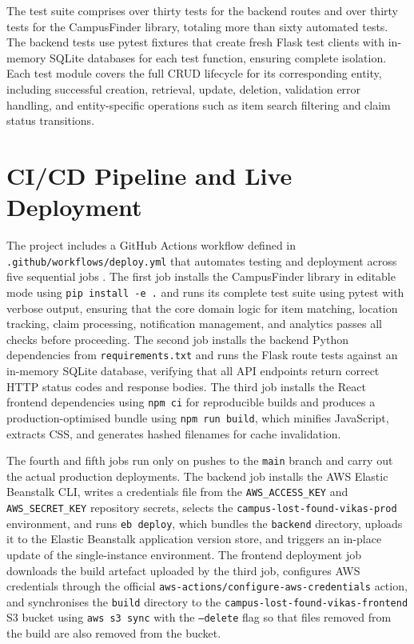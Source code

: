 \documentclass[conference]{IEEEtran}
\begin{document}
The test suite comprises over thirty tests for the backend routes and over thirty tests for the CampusFinder library, totaling more than sixty automated tests. The backend tests use pytest fixtures that create fresh Flask test clients with in-memory SQLite databases for each test function, ensuring complete isolation. Each test module covers the full CRUD lifecycle for its corresponding entity, including successful creation, retrieval, update, deletion, validation error handling, and entity-specific operations such as item search filtering and claim status transitions.

\section{CI/CD Pipeline and Live Deployment}

The project includes a GitHub Actions workflow defined in \texttt{.github/workflows/deploy.yml} that automates testing and deployment across five sequential jobs \cite{cicd}. The first job installs the CampusFinder library in editable mode using \texttt{pip install -e .} and runs its complete test suite using pytest with verbose output, ensuring that the core domain logic for item matching, location tracking, claim processing, notification management, and analytics passes all checks before proceeding. The second job installs the backend Python dependencies from \texttt{requirements.txt} and runs the Flask route tests against an in-memory SQLite database, verifying that all API endpoints return correct HTTP status codes and response bodies. The third job installs the React frontend dependencies using \texttt{npm ci} for reproducible builds and produces a production-optimised bundle using \texttt{npm run build}, which minifies JavaScript, extracts CSS, and generates hashed filenames for cache invalidation.

The fourth and fifth jobs run only on pushes to the \texttt{main} branch and carry out the actual production deployments. The backend job installs the AWS Elastic Beanstalk CLI, writes a credentials file from the \texttt{AWS\_ACCESS\_KEY} and \texttt{AWS\_SECRET\_KEY} repository secrets, selects the \texttt{campus-lost-found-vikas-prod} environment, and runs \texttt{eb deploy}, which bundles the \texttt{backend} directory, uploads it to the Elastic Beanstalk application version store, and triggers an in-place update of the single-instance environment. The frontend deployment job downloads the build artefact uploaded by the third job, configures AWS credentials through the official \texttt{aws-actions/configure-aws-credentials} action, and synchronises the \texttt{build} directory to the \texttt{campus-lost-found-vikas-frontend} S3 bucket using \texttt{aws s3 sync} with the \texttt{--delete} flag so that files removed from the build are also removed from the bucket.
\end{document}
